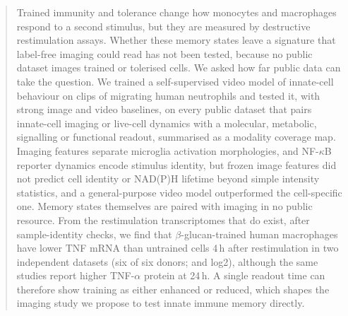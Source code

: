\begin{abstract}
Trained immunity and tolerance change how monocytes and macrophages respond to a second
stimulus, but they are measured by destructive restimulation assays. Whether these memory
states leave a signature that label-free imaging could read has not been tested, because no
public dataset images trained or tolerised cells. We asked how far public data can take the
question. We trained a self-supervised video model of innate-cell behaviour on
 clips of migrating human neutrophils and tested it, with strong image and
video baselines, on every public dataset that pairs innate-cell imaging or live-cell dynamics
with a molecular, metabolic, signalling or functional readout, summarised as a modality
coverage map. Imaging features separate microglia activation morphologies, and NF-\(\kappa\)B
reporter dynamics encode stimulus identity, but frozen image features did not predict cell
identity or NAD(P)H lifetime beyond simple intensity statistics, and a general-purpose
video model outperformed the cell-specific one. Memory states themselves are paired with
imaging in no public resource. From the restimulation transcriptomes that do exist, after
sample-identity checks, we find that $\beta$-glucan-trained human macrophages have lower TNF
mRNA than untrained cells 4\,h after restimulation in two independent datasets (six of six
donors;  and  log2), although the same studies
report higher TNF-$\alpha$ protein at 24\,h. A single readout time can therefore show
training as either enhanced or reduced, which shapes the imaging study we propose to test
innate immune memory directly.
\end{abstract}
